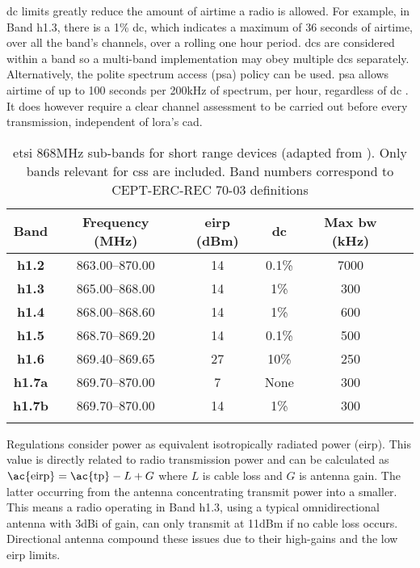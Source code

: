 \ac{dc} limits greatly reduce the amount of airtime a radio is allowed. For example, in Band h1.3, there is a 1\% \ac{dc}, which indicates a maximum of 36 seconds of airtime, over all the band's channels, over a rolling one hour period. \ac{dc}s are considered within a band so a multi-band implementation may obey multiple \ac{dc}s separately. Alternatively, the polite spectrum access (\ac{psa}) policy can be used. \ac{psa} allows airtime of up to 100 seconds per 200kHz of spectrum, per hour, regardless of \ac{dc} \cite{3YP:ETSI_PSA}. It does however require a clear channel assessment to be carried out before every transmission, independent of \ac{lora}'s \ac{cad}.

\begin{table}[H]
\centering\small
\caption[\ac{etsi} 868MHz sub-band breakdown]{\ac{etsi} 868MHz sub-bands for short range devices (adapted from \cite{3YP:ETSI_HARMONISED_REG}). Only bands relevant for \ac{css} are included. Band numbers correspond to CEPT-ERC-REC 70-03 definitions \cite{3YP:CEPT_ERC_REC}}
\label{tab:ETSIBands}
\renewcommand*{\arraystretch}{1.1}
\begin{tabular}{c|ccccc}
    \toprule
    \textbf{Band} & \textbf{Frequency} (MHz) & \textbf{\ac{eirp}} (dBm)  & \textbf{\ac{dc}} & \textbf{Max \ac{bw}} (kHz) \\
    \midrule\addlinespace
    \textbf{h1.2} & 863.00--870.00 & 14 & 0.1\% & 7000 \\
    \textbf{h1.3} & 865.00--868.00 & 14 & 1\% & 300 \\
    \textbf{h1.4} & 868.00--868.60 & 14 & 1\% & 600 \\
    \textbf{h1.5} & 868.70--869.20 & 14 & 0.1\% & 500 \\
    \textbf{h1.6} & 869.40--869.65 & 27 & 10\% & 250 \\
    \textbf{h1.7a} & 869.70--870.00 & 7 & None & 300 \\
    \textbf{h1.7b} & 869.70--870.00 & 14 & 1\% & 300 \\   
    \addlinespace\bottomrule
\end{tabular}
\end{table}

Regulations consider power as equivalent isotropically radiated power (\ac{eirp}). This value is directly related to radio transmission power and can be calculated as $\text{\ac{eirp}} = \text{\ac{tp}} - L + G$ where $L$ is cable loss and $G$ is antenna gain. The latter occurring from the antenna concentrating transmit power into a smaller. This means a radio operating in Band h1.3, using a typical omnidirectional antenna with 3dBi of gain, can only transmit at 11dBm if no cable loss occurs. Directional antenna compound these issues due to their high-gains and the low \ac{eirp} limits.

